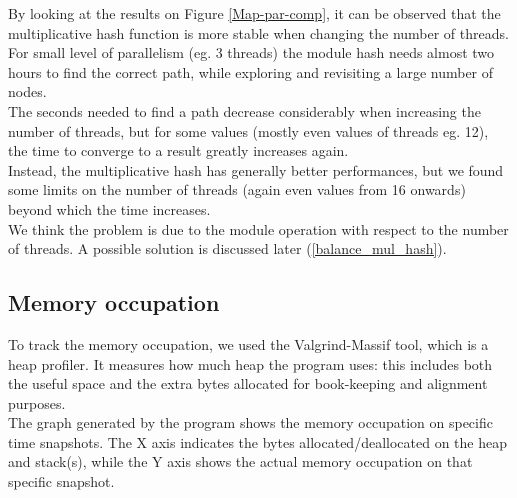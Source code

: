 By looking at the results on Figure \ref{Map-par-comp}, it can be observed that the multiplicative hash function is more stable when changing the number of threads.
\\
For small level of parallelism (eg. 3 threads) the module hash needs almost two hours to find the correct path, while exploring and revisiting a large number of nodes.
\\
The seconds needed to find a path decrease considerably when increasing the number of threads, but for some values (mostly even values of threads eg. 12), the time to converge to a result greatly increases again.
\\
Instead, the multiplicative hash has generally better performances, but we found some limits on the number of threads (again even values from 16 onwards) beyond which the time increases.
\\
We think the problem is due to the module operation with respect to the number of threads. A possible solution is discussed later (\ref{balance_mul_hash}).

\subsection{Memory occupation}

To track the memory occupation, we used the Valgrind-Massif \cite{bibValgrind} tool, which is a heap profiler. It measures how much heap the program uses: this includes both the useful space
and the extra bytes allocated for book-keeping and alignment purposes.
\\
The graph generated by the program shows the memory occupation on specific time snapshots. The X axis indicates the bytes allocated/deallocated on the heap and stack(s), while the Y axis shows the actual memory occupation on that specific snapshot.

\vspace{0.5cm}

